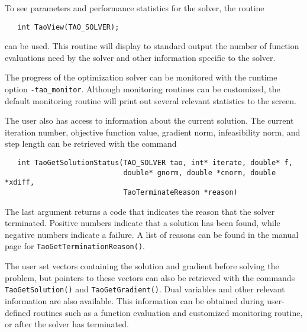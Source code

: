 To see parameters and performance statistics for the solver, the
routine
\begin{verbatim}
   int TaoView(TAO_SOLVER);
\end{verbatim}
can be used.  This routine will display to standard output the number
of function evaluations need by the solver and other information
specific to the solver.

The progress of the optimization solver can be monitored with
the runtime option {\tt -tao\_monitor}.  Although monitoring routines
can be customized, the default monitoring routine will print out 
several relevant statistics to the screen.

The user also has access to information about the current solution.
The current iteration number, objective function value, gradient
norm, infeasibility norm, and step length 
can be retrieved with the command 
\begin{verbatim}
   int TaoGetSolutionStatus(TAO_SOLVER tao, int* iterate, double* f, 
                            double* gnorm, double *cnorm, double *xdiff, 
                            TaoTerminateReason *reason)
\end{verbatim}
\noindent
The last argument returns
a code that indicates the reason that the solver terminated.  Positive 
numbers indicate that a solution has been found, while negative numbers
indicate a failure.  A list of reasons can be found in the manual page
for {\tt TaoGetTerminationReason()}.

The user set
vectors containing the solution and gradient before solving
the problem, but pointers to these vectors can also be retrieved with the
commands {\tt TaoGetSolution()}
and {\tt TaoGetGradient()}.  
Dual variables and other relevant information are also available. 
This information can be obtained during
user-defined routines such as a function evaluation and customized
monitoring routine, or after the solver has terminated.

